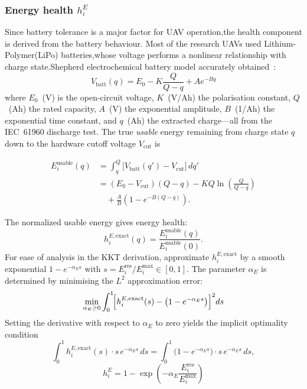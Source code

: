 \documentclass[journal]{IEEEtran}
\begin{document}
\subsubsection{Energy health $h_{i}^{E}$}

Since battery tolerance is a major factor for UAV operation,the health component is derived from the battery behaviour. Most of the research UAVs used Lithium-Polymer(LiPo) batteries,whose voltage performs a nonlinear relationship with charge state.Shepherd electrochemical battery model accurately obtained~\cite{ref10}:
\begin{equation}\label{eq:shepherd}
  V_{\mathrm{batt}}(q)=E_{0}-K\frac{Q}{Q-q}
  +Ae^{-Bq}
\end{equation}
where $E_{0}$~(V) is the open-circuit voltage, $K$~(V/Ah)
the polarisation constant, $Q$~(Ah) the rated capacity,
$A$~(V) the exponential amplitude, $B$~(1/Ah) the
exponential time constant, and $q$~(Ah) the extracted
charge—all from the IEC~61960 discharge test.  The true
\emph{usable} energy remaining from charge state $q$ down
to the hardware cutoff voltage $V_{\mathrm{cut}}$ is

\begin{equation}
\label{eq:Eusable}
\begin{aligned}
E_{i}^{\mathrm{usable}}(q)
&= \int_{q}^{Q}\!\bigl[V_{\mathrm{batt}}(q')-V_{\mathrm{cut}}\bigr]\,dq' \\
&= (E_{0}-V_{\mathrm{cut}})(Q-q)
 -KQ\ln\!\left(\frac{Q}{Q-q}\right)
 \\ \nonumber &\quad
 +\frac{A}{B}\!\left(1-e^{-B(Q-q)}\right).
\end{aligned}
\end{equation}


The normalized usable energy gives energy health:
\begin{equation}
\label{eq:hE_exact}
  h_{i}^{E,\mathrm{exact}}(q)
  =\frac{E_{i}^{\mathrm{usable}}(q)}{E_{i}^{\mathrm{usable}}(0)}.
\end{equation}
 For ease of analysis in the KKT derivation,
approximate $h_{i}^{E,\mathrm{exact}}$ by a smooth
exponential $1-e^{-\alpha_{E}s}$ with $s=E_{i}^{\mathrm{res}}/E_{i}^{\max}
\in[0,1]$.  The parameter $\alpha_{E}$ is determined by
minimising the $L^{2}$ approximation error:
\begin{equation}\label{eq:alpha_opt}
  \min_{\alpha_{E}\geq0}
  \int_{0}^{1}\!\Bigl[h_{i}^{E,\mathrm{exact}}(s)
  -\bigl(1-e^{-\alpha_{E}s}\bigr)\Bigr]^{2}ds
\end{equation}
Setting the derivative with respect to $\alpha_{E}$ to zero
yields the implicit optimality condition
\begin{equation}\label{eq:alpha_eq}
  \int_{0}^{1}h_{i}^{E,\mathrm{exact}}(s)\cdot s\,
  e^{-\alpha_{E}s}\,ds
  =\int_{0}^{1}\bigl(1-e^{-\alpha_{E}s}\bigr)\cdot s\,
  e^{-\alpha_{E}s}\,ds,
\end{equation}
\begin{equation}\label{eq:hE}
  h_{i}^{E}=1-\exp\!\left(-\alpha_E
  \frac{E_{i}^{\mathrm{res}}}{E_{i}^{\max}}\right)
\end{equation}
\end{document}

